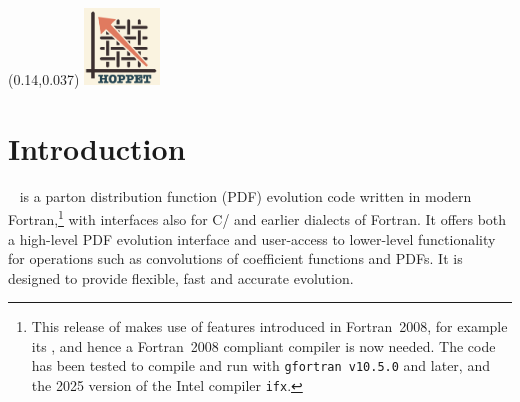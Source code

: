 \documentclass[preprint,1p,a4paper,11pt]{elsarticle}
\begin{document}
\begin{frontmatter}
\begin{keyword}


\end{keyword}
  \begin{textblock*}{2cm}(0.14\textwidth,0.037\textheight)  %
    \includegraphics[width=2cm]{logo/2025-09-logo.png}
  \end{textblock*}
\end{frontmatter}
\tableofcontents
\section{Introduction}


\hoppet~\cite{Salam:2008qg} is a parton distribution function (PDF)
evolution code written in modern Fortran,\footnote{This release of
\hoppet makes use of features introduced in Fortran~2008, for example
its , and hence a Fortran~2008 compliant
compiler is now needed. The code has been tested to compile and run
with \texttt{gfortran v10.5.0} and later, and the 2025 version of the
Intel compiler \texttt{ifx}.}  with interfaces also for C/\CPP{} and
earlier dialects of Fortran.
%
It offers both a high-level PDF evolution interface and user-access to
lower-level functionality for operations such as convolutions of
coefficient functions and PDFs.
%
It is designed to provide flexible, fast and accurate evolution.
\end{document}
